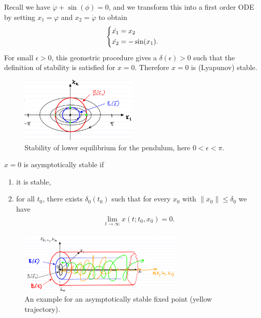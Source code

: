 \begin{ex}
	Recall we have $\ddot{\varphi} + \sin(\phi) = 0$, and we transform this into a first order ODE by setting $x_1 = \varphi$ and $x_2 = \dot{\varphi}$ to obtain
	\begin{align}
		\begin{dcases}
			\dot{x_1} = x_2 \\
			\dot{x_2} = -\sin(x_1).
		\end{dcases}
	\end{align}
	For small $\epsilon>0$, this geometric procedure gives a $\delta(\epsilon)>0$ such that the definition of stability is satisfied for $x=0$. Therefore $x=0$ is (Lyapunov) stable.
	\begin{figure}[h!]
		\centering
		\includegraphics[width=0.5\textwidth]{figures/ch2/2pendulum_stability.png}
		\caption{Stability of lower equilibrium for the pendulum, here $0<\epsilon<\pi $.}
	\end{figure}
\end{ex}

\begin{definition}
$x=0$ is asymptotically stable if
\begin{enumerate}
	\item it is stable,
	\item for all $t_0$, there exists $\delta_0(t_0)$ such that for every $x_0$ with $\| x_0 \| \leq \delta_0$ we have
		\begin{align}
			\boxed{\lim_{t\to \infty } x(t; t_0, x_0) = 0.}
		\end{align}
\end{enumerate}
\begin{figure}[h]
	\centering
	\includegraphics[width=0.7\textwidth]{figures/ch2/3asymp_stability.png}
	\caption{An example for an asymptotically stable fixed point (yellow trajectory).}
\end{figure}
\end{definition}

